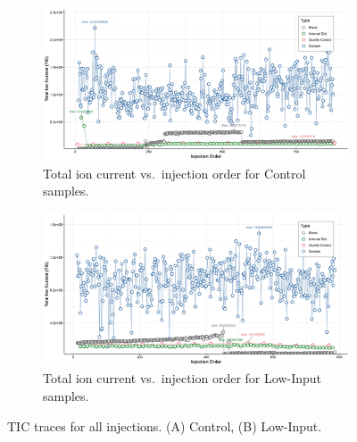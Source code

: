 \documentclass[10pt,letterpaper]{article}
\begin{document}
\begin{figure}[htp]
  \centering

  \begin{subfigure}[t]{\textwidth}
    \includegraphics[width=\linewidth]{fig/supp/SuppFig_1A_TIC_Control}
    \caption{Total ion current vs.\ injection order for Control samples.}
    \label{fig:S1A}
  \end{subfigure}

  \vspace{1em}

  \begin{subfigure}[t]{\textwidth}
    \includegraphics[width=\linewidth]{fig/supp/SuppFig_1B_TIC_LowInput.png}
    \caption{Total ion current vs.\ injection order for Low-Input samples.}
    \label{fig:S1B}
  \end{subfigure}

  \caption{TIC traces for all injections.  (A) Control, (B) Low-Input.}
  \label{fig:S1}
\end{figure}
\end{document}
